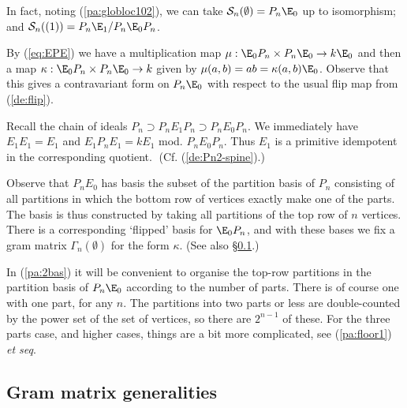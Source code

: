 \documentclass[reqno,10pt,a4paper]{amsart}
\newcommand{\red}[1]{\textcolor{red}{#1}}
\newcommand{\ppm}[1]{\red{#1}}
\newcommand{\cell}{\mathcal{S}}
\newcommand{\SSS}{\mathcal{S}} %
\newcommand{\confer}[1]{$\;$(Cf. (#1).)}  %
\newcommand{\Gram}{\Gamma}
\begin{document}
In fact,
noting (\ref{pa:globloc102}), 
we can take 
$\SSS_n(\emptyset) = P_n \E_0$ up to isomorphism; and 
$\SSS_n((1)) = P_n \E_1 / P_n \E_0 P_n$. 

By (\ref{eq:EPE}) we have a 
multiplication map
$\mu :  \E_0 P_n \times P_n \E_0  \rightarrow k\E_0$
and then a map $\kappa :  \E_0 P_n \times P_n \E_0  \rightarrow k$
given by 
$\mu(a,b)=ab = \kappa(a,b) \E_0$. 
Observe that this gives a contravariant form on $P_n \E_0$
with respect to the usual flip map from (\ref{de:flip}). 

Recall the chain of ideals
$P_n \supset P_n E_1 P_n \supset P_n E_0 P_n$.
We immediately have $E_1 E_1 = E_1$ and 
$E_1 P_n E_1 = k E_1$ mod. $P_nE_0 P_n$.
Thus $E_1$ is a primitive idempotent in the corresponding quotient. 
%
\confer{\ref{de:Pn2-spine}}




\mdef 
\label{de:PnE0basis}
Observe that $P_n E_0$ has basis the subset of the partition basis of $P_n$ consisting of all partitions in which the bottom row of vertices exactly make one of the parts. The basis is thus constructed by taking all partitions of the top row of $n$ vertices. 
There is a corresponding `flipped' basis for $\E_0 P_n$,
and with these bases we fix a gram matrix $\Gram_n(\emptyset)$ for the form $\kappa$. 
(See also \S\ref{ss:gramgen00}.)

\medskip 

In (\ref{pa:2bas})
it will be convenient to organise the top-row partitions 
in the partition basis of $P_n \E_0$ 
according to the number of parts.
There is of course one with one part, for any $n$. 
The partitions into two parts or less are 
double-counted by   %
the power set of the set of vertices, so there are $2^{n-1}$ of these. 
For the three parts case, and higher cases, things are a bit more complicated, 
see (\ref{pa:floor1}) {\em et seq}. 








\subsection{Gram matrix generalities} \label{ss:gramgen00} 
\end{document}
